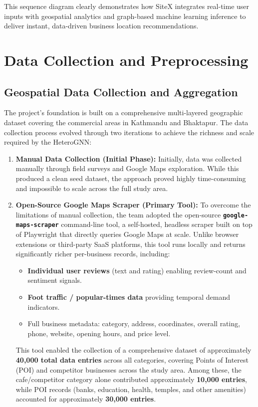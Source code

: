 This sequence diagram clearly demonstrates how SiteX integrates real-time user inputs with geospatial analytics and graph-based machine learning inference to deliver instant, data-driven business location recommendations.


\section{Data Collection and Preprocessing}
\subsection{Geospatial Data Collection and Aggregation}

The project's foundation is built on a comprehensive multi-layered geographic dataset covering the commercial areas in Kathmandu and Bhaktapur. The data collection process evolved through two iterations to achieve the richness and scale required by the HeteroGNN:

\begin{enumerate}
	\item \textbf{Manual Data Collection (Initial Phase):} Initially, data was collected manually through field surveys and Google Maps exploration. While this produced a clean seed dataset, the approach proved highly time-consuming and impossible to scale across the full study area.
	
	\item \textbf{Open-Source Google Maps Scraper (Primary Tool):} To overcome the limitations of manual collection, the team adopted the open-source \textbf{\texttt{google\allowbreak-\allowbreak maps\allowbreak-\allowbreak scraper}} command-line tool, a self-hosted, headless scraper built on top of Playwright that directly queries Google Maps at scale. Unlike browser extensions or third-party SaaS platforms, this tool runs locally and returns significantly richer per-business records, including:
	\begin{itemize}
		\item \textbf{Individual user reviews} (text and rating) enabling review-count and sentiment signals.
		\item \textbf{Foot traffic / popular-times data} providing temporal demand indicators.
		\item Full business metadata: category, address, coordinates, overall rating, phone, website, opening hours, and price level.
	\end{itemize}
	This tool enabled the collection of a comprehensive dataset of approximately \textbf{40,000 total data entries} across all categories, covering Points of Interest (POI) and competitor businesses across the study area. Among these, the cafe/competitor category alone contributed approximately \textbf{10,000 entries}, while POI records (banks, education, health, temples, and other amenities) accounted for approximately \textbf{30,000 entries}.
\end{enumerate}

